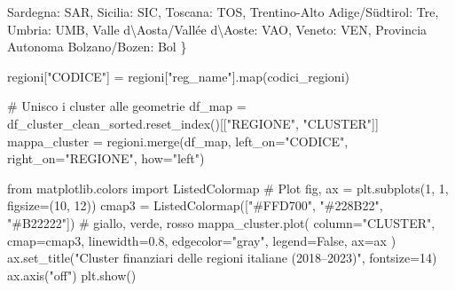\documentclass[
  letterpaper,
  DIV=11,
  numbers=noendperiod]{scrartcl}
\newenvironment{Shaded}{\begin{snugshade}}{\end{snugshade}}
\newcommand{\BuiltInTok}[1]{\textcolor[rgb]{0.00,0.23,0.31}{#1}}
\newcommand{\CharTok}[1]{\textcolor[rgb]{0.13,0.47,0.30}{#1}}
\newcommand{\CommentTok}[1]{\textcolor[rgb]{0.37,0.37,0.37}{#1}}
\newcommand{\DecValTok}[1]{\textcolor[rgb]{0.68,0.00,0.00}{#1}}
\newcommand{\FloatTok}[1]{\textcolor[rgb]{0.68,0.00,0.00}{#1}}
\newcommand{\ImportTok}[1]{\textcolor[rgb]{0.00,0.46,0.62}{#1}}
\newcommand{\NormalTok}[1]{\textcolor[rgb]{0.00,0.23,0.31}{#1}}
\newcommand{\OperatorTok}[1]{\textcolor[rgb]{0.37,0.37,0.37}{#1}}
\newcommand{\StringTok}[1]{\textcolor[rgb]{0.13,0.47,0.30}{#1}}
\newcommand{\VariableTok}[1]{\textcolor[rgb]{0.07,0.07,0.07}{#1}}
\begin{document}
\begin{Shaded}
\begin{Highlighting}[]
    \StringTok{\textquotesingle{}Sardegna\textquotesingle{}}\NormalTok{: }\StringTok{\textquotesingle{}SAR\textquotesingle{}}\NormalTok{, }\StringTok{\textquotesingle{}Sicilia\textquotesingle{}}\NormalTok{: }\StringTok{\textquotesingle{}SIC\textquotesingle{}}\NormalTok{, }\StringTok{\textquotesingle{}Toscana\textquotesingle{}}\NormalTok{: }\StringTok{\textquotesingle{}TOS\textquotesingle{}}\NormalTok{, }\StringTok{\textquotesingle{}Trentino{-}Alto Adige/Südtirol\textquotesingle{}}\NormalTok{: }\StringTok{\textquotesingle{}Tre\textquotesingle{}}\NormalTok{,}
    \StringTok{\textquotesingle{}Umbria\textquotesingle{}}\NormalTok{: }\StringTok{\textquotesingle{}UMB\textquotesingle{}}\NormalTok{, }\StringTok{\textquotesingle{}Valle d}\CharTok{\textbackslash{}\textquotesingle{}}\StringTok{Aosta/Vallée d}\CharTok{\textbackslash{}\textquotesingle{}}\StringTok{Aoste\textquotesingle{}}\NormalTok{: }\StringTok{\textquotesingle{}VAO\textquotesingle{}}\NormalTok{, }\StringTok{\textquotesingle{}Veneto\textquotesingle{}}\NormalTok{: }\StringTok{\textquotesingle{}VEN\textquotesingle{}}\NormalTok{,}
    \StringTok{\textquotesingle{}Provincia Autonoma Bolzano/Bozen\textquotesingle{}}\NormalTok{: }\StringTok{\textquotesingle{}Bol\textquotesingle{}}
\NormalTok{\}}

\NormalTok{regioni[}\StringTok{"CODICE"}\NormalTok{] }\OperatorTok{=}\NormalTok{ regioni[}\StringTok{"reg\_name"}\NormalTok{].}\BuiltInTok{map}\NormalTok{(codici\_regioni)}

\CommentTok{\# Unisco i cluster alle geometrie}
\NormalTok{df\_map }\OperatorTok{=}\NormalTok{ df\_cluster\_clean\_sorted.reset\_index()[[}\StringTok{"REGIONE"}\NormalTok{, }\StringTok{"CLUSTER"}\NormalTok{]]}
\NormalTok{mappa\_cluster }\OperatorTok{=}\NormalTok{ regioni.merge(df\_map, left\_on}\OperatorTok{=}\StringTok{"CODICE"}\NormalTok{, right\_on}\OperatorTok{=}\StringTok{"REGIONE"}\NormalTok{, how}\OperatorTok{=}\StringTok{"left"}\NormalTok{)}

\ImportTok{from}\NormalTok{ matplotlib.colors }\ImportTok{import}\NormalTok{ ListedColormap}
\CommentTok{\# Plot}
\NormalTok{fig, ax }\OperatorTok{=}\NormalTok{ plt.subplots(}\DecValTok{1}\NormalTok{, }\DecValTok{1}\NormalTok{, figsize}\OperatorTok{=}\NormalTok{(}\DecValTok{10}\NormalTok{, }\DecValTok{12}\NormalTok{))}
\NormalTok{cmap3 }\OperatorTok{=}\NormalTok{ ListedColormap([}\StringTok{"\#FFD700"}\NormalTok{, }\StringTok{"\#228B22"}\NormalTok{, }\StringTok{"\#B22222"}\NormalTok{])  }\CommentTok{\# giallo, verde, rosso}
\NormalTok{mappa\_cluster.plot(}
\NormalTok{    column}\OperatorTok{=}\StringTok{"CLUSTER"}\NormalTok{,}
\NormalTok{    cmap}\OperatorTok{=}\NormalTok{cmap3,}
\NormalTok{    linewidth}\OperatorTok{=}\FloatTok{0.8}\NormalTok{,}
\NormalTok{    edgecolor}\OperatorTok{=}\StringTok{"gray"}\NormalTok{,}
\NormalTok{    legend}\OperatorTok{=}\VariableTok{False}\NormalTok{,}
\NormalTok{    ax}\OperatorTok{=}\NormalTok{ax}
\NormalTok{)}
\NormalTok{ax.set\_title(}\StringTok{"Cluster finanziari delle regioni italiane (2018–2023)"}\NormalTok{, fontsize}\OperatorTok{=}\DecValTok{14}\NormalTok{)}
\NormalTok{ax.axis(}\StringTok{"off"}\NormalTok{)}
\NormalTok{plt.show()}
\end{Highlighting}
\end{Shaded}
\end{document}
